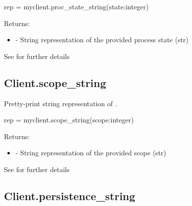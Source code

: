 \format

\pyspecificstart
\begin{codepar}
rep = myclient.proc_state_string(state:integer)
\end{codepar}
\pyspecificend

\begin{arglist}
\end{arglist}

Returns:
\begin{itemize}
    \item {} - String representation of the provided process state (str)
\end{itemize}

See  for further details


\subsection{Client.scope_string}

\summary

Pretty-print string representation of .

\format

\pyspecificstart
\begin{codepar}
rep = myclient.scope_string(scope:integer)
\end{codepar}
\pyspecificend

\begin{arglist}
\end{arglist}

Returns:
\begin{itemize}
    \item {} - String representation of the provided scope (str)
\end{itemize}

See  for further details


\subsection{Client.persistence_string}

\summary

